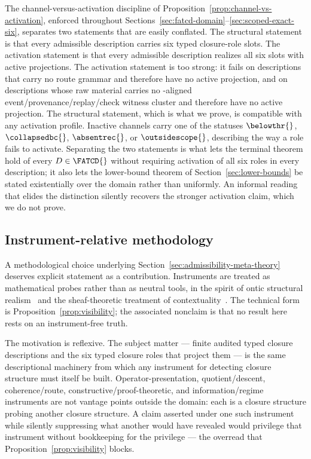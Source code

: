 The channel-versus-activation discipline of
Proposition~\ref{prop:channel-vs-activation}, enforced throughout
Sections~\ref{sec:fatcd-domain}--\ref{sec:scoped-exact-six},
separates two statements that are easily conflated. The structural
statement is that every admissible description carries six typed
closure-role slots. The activation statement is that every admissible
description realizes all six slots with active projections. The
activation statement is too strong: it fails on descriptions that
carry no route grammar and therefore have no active \Pthree{}
projection, and on descriptions whose raw material carries no
\Psix{}-aligned event/provenance/replay/check witness cluster and
therefore have no active \Psix{} projection. The structural
statement, which is what we prove, is compatible with any activation
profile. Inactive channels carry one of the statuses
\(\belowthr{}\), \(\collapsedbc{}\), \(\absentrec{}\), or
\(\outsidescope{}\), describing the way a role fails to activate.
Separating the two statements is what lets the terminal theorem hold
of every \(D \in \FATCD{}\) without requiring activation of all six
roles in every description; it also lets the lower-bound theorem of
Section~\ref{sec:lower-bounds} be stated existentially over the
domain rather than uniformly. An informal reading that elides the
distinction silently recovers the stronger activation claim, which we
do not prove.

\subsection{Instrument-relative methodology}\label{subsec:discussion-instrument-relative}

A methodological choice underlying
Section~\ref{sec:admissibility-meta-theory} deserves explicit
statement as a contribution. Instruments are treated as mathematical
probes rather than as neutral tools, in the spirit of ontic structural
realism~\citep{LadymanRoss2007} and the sheaf-theoretic treatment of
contextuality~\citep{AbramskyBrandenburger2011}. The technical form
is Proposition~\ref{prop:visibility}; the associated nonclaim is that
no result here rests on an instrument-free truth.

The motivation is reflexive. The subject matter --- finite audited
typed closure descriptions and the six typed closure roles that
project them --- is the same descriptional machinery from which any
instrument for detecting closure structure must itself be built.
Operator-presentation, quotient/descent, coherence/route,
constructive/proof-theoretic, and information/regime instruments are
not vantage points outside the domain: each is a closure structure
probing another closure structure. A claim asserted under one such
instrument while silently suppressing what another would have
revealed would privilege that instrument without bookkeeping for the
privilege --- the overread that Proposition~\ref{prop:visibility}
blocks.

